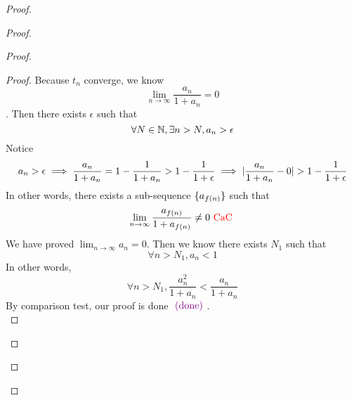 \documentclass{report}
\begin{document}
\begin{proof}
\begin{proof}
\begin{proof}
\begin{proof}
Because $t_n$ converge, we know 
 \begin{equation}
\lim_{n\to\infty}\frac{a_n}{1+a_n}=0
\end{equation}
. Then there exists $\epsilon $ such that
\begin{equation}
\forall N\in\mathbb{N}, \exists n>N, a_n>\epsilon 
\end{equation}
Notice
\begin{equation}
a_n>\epsilon \implies \frac{a_n}{1+a_n}=1-\frac{1}{1+a_n}>1-\frac{1}{1+\epsilon }\implies \abso{\frac{a_n}{1+a_n}-0}>1-\frac{1}{1+\epsilon }
\end{equation}
In other words, there exists a sub-sequence $\{ a_{f(n)} \}$ such that
\begin{equation}
\lim_{n\to\infty}\frac{a_{f(n)}}{1+a_{f(n)}}\neq 0\text{ \textcolor{red}{CaC} }
\end{equation}
We have proved $\lim_{n\to\infty}a_n=0$. Then we know there exists $N_1$ such that
 \begin{equation}
\forall n>N_1, a_n<1
\end{equation}
In other words,
\begin{equation}
\forall n>N_1, \frac{a_n^2}{1+a_n}<\frac{a_n}{1+a_n}
\end{equation}
By comparison test, our proof is done $\textcolor{violet}{\text{ (done) }}$.\\


\end{proof}
\end{proof}
\end{proof}
\end{proof}
\end{document}
